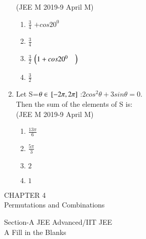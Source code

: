 \documentclass[journal,10pt,twocolumn]{IEEEtran}
\theoremstyle{remark}
\begin{document}
\begin{enumerate}
\hfill {(JEE M 2019-9 April M)}\\
\begin{enumerate}
\item $\frac{3}{4}$ $+cos20^0$
\item $\frac{3}{4}$\\
 \item $\frac{3}{2}$ $\left(1+cos20^0\quad\right)$ 
 \item $\frac{3}{2}$\\
 \end{enumerate}
\item Let S=$\theta \in {}\left[-2\pi, 2\pi\right]$ :$2cos^2\theta + 3sin\theta=0.$\\
 Then the sum of the elements of S is:\\
 
\hfill {(JEE M 2019-9 April M)}\\
\begin{enumerate}
\item $\frac{13\pi}{6}$ 
\item $\frac{5\pi}{3}$
 \item $2$
 \item $1$\\
\end{enumerate} 
\end{enumerate}
\begin{center}
 CHAPTER 4\\
Permutations and Combinations \\ 
\end{center}
Section-A JEE Advanced/IIT JEE   
\\
A Fill in the Blanks\\
\end{document}
